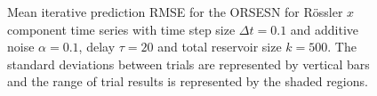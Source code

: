 \begin{figure}
    \centering

    \centering

    \caption{Mean iterative prediction RMSE for the ORSESN for R\"ossler $x$ component time series with time step size $\Delta t=0.1$ and additive noise $\alpha=0.1$, delay $\tau=20$ and total reservoir size $k=500$. The standard deviations between trials are represented by vertical bars and the range of trial results is represented by the shaded regions.}
    \label{fig:ORSESN_rossler_iterative}
\end{figure}

